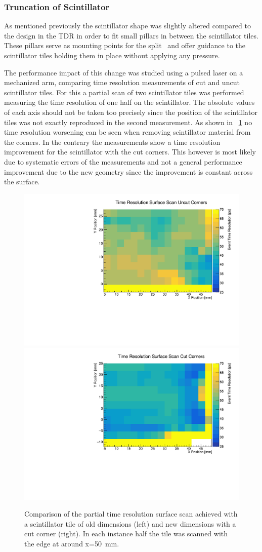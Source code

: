 \documentclass[../BTOF_summary.tex]{subfiles}
\begin{document}
\subsubsection*{Truncation of Scintillator}
    
As mentioned previously the scintillator shape was slightly altered compared to the design in the TDR in order to fit small pillars in between the scintillator tiles.
These pillars serve as mounting points for the split \railboard\ and offer guidance to the scintillator tiles holding them in place without applying any pressure.

The performance impact of this change was studied using a pulsed laser on a mechanized arm, comparing time resolution measurements of cut and uncut scintillator tiles.
For this a partial scan of two scintillator tiles was performed measuring the time resolution of one half on the scintillator.
The absolute values of each axis should not be taken too precisely since the position of the scintillator tiles was not exactly reproduced in the second measurement.
As shown in \fig~\ref{fig:Surface_Scan_cutUncut} no time resolution worsening can be seen when removing scintillator material from the corners.
In the contrary the measurements show a time resolution improvement for the scintillator with the cut corners.
This however is most likely due to systematic errors of the measurements and not a general performance improvement due to the new geometry since the improvement is constant across the surface.

\begin{figure}[htpb]
	\centering
	\includegraphics[width=.49\textwidth]{fig/Time_Resolution_Surface_Scan_Uncut_Corners.pdf}
	\includegraphics[width=.49\textwidth]{fig/Time_Resolution_Surface_Scan_Cut_Corners.pdf}
	\caption{Comparison of the partial time resolution surface scan achieved with a scintillator tile of old dimensions (left) and new dimensions with a cut corner (right). In each instance half the tile was scanned with the edge at around x=\SI{50}{mm}.}
	\label{fig:Surface_Scan_cutUncut}
\end{figure}
\end{document}
